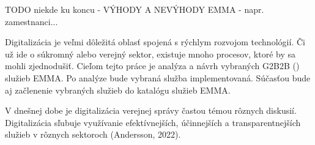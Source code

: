 %


\startthesis
\startbodymatter


\TODO
TODO niekde ku koncu - VÝHODY A NEVÝHODY EMMA - napr. zamestnanci...



Digitalizácia je veľmi dôležitá oblasť spojená s rýchlym rozvojom technológií. Či už ide o súkromný alebo verejný sektor, existuje mnoho procesov, ktoré by sa mohli zjednodušiť. Cieľom tejto práce je analýza a návrh vybraných G2B2B () služieb EMMA. Po analýze bude vybraná služba implementovaná. Súčasťou bude aj začlenenie vybraných služieb do katalógu služieb EMMA.



V dnešnej dobe je digitalizácia verejnej správy častou témou rôznych diskusií. Digitalizácia sľubuje využívanie efektívnejších, účinnejších a transparentnejších služieb v rôznych sektoroch \scr(Andersson, 2022).

